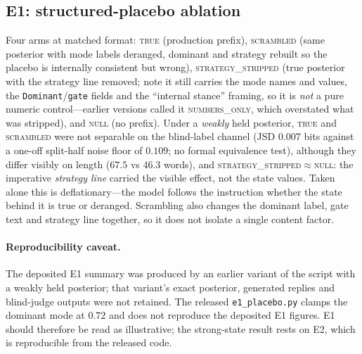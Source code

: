 \documentclass[11pt]{article}
\begin{document}
\subsection{E1: structured-placebo ablation}
Four arms at matched format: \textsc{true} (production prefix), \textsc{scrambled}
(same posterior with mode labels deranged, dominant and strategy rebuilt so the
placebo is internally consistent but wrong), \textsc{strategy\_stripped} (true
posterior with the strategy line removed; note it still carries the mode names
and values, the \texttt{Dominant}/\texttt{gate} fields and the ``internal
stance'' framing, so it is \emph{not} a pure numeric control---earlier versions
called it \textsc{numbers\_only}, which overstated what was stripped), and
\textsc{null} (no prefix). Under a \emph{weakly} held posterior,
\textsc{true} and \textsc{scrambled} were not separable on the blind-label
channel (JSD $0.007$ bits against a one-off split-half noise floor of $0.109$;
no formal equivalence test), although they differ visibly on length ($67.5$ vs
$46.3$ words), and \textsc{strategy\_stripped}${\approx}$\textsc{null}: the
imperative \emph{strategy line} carried the visible effect, not the state
values. Taken alone this is deflationary---the model follows the instruction
whether the state behind it is true or deranged. Scrambling also changes the
dominant label, gate text and strategy line together, so it does not isolate a
single content factor.

\paragraph{Reproducibility caveat.} The deposited E1 summary was produced by an
earlier variant of the script with a weakly held posterior; that variant's exact
posterior, generated replies and blind-judge outputs were not retained. The
released \texttt{e1\_placebo.py} clamps the dominant mode at $0.72$ and does not
reproduce the deposited E1 figures. E1 should therefore be read as illustrative;
the strong-state result rests on E2, which is reproducible from the released
code.
\end{document}
